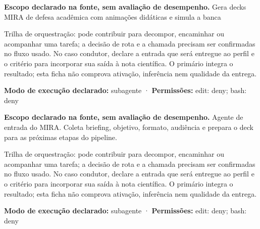 
\begin{descricao}
\textbf{Escopo declarado na fonte, sem avaliação de desempenho.}
Gera decks MIRA de defesa acadêmica com animações didáticas e simula a banca
\end{descricao}

\begin{funcao}
Trilha de orquestração: pode contribuir para decompor, encaminhar ou acompanhar uma tarefa; a decisão de rota e a chamada precisam ser confirmadas no fluxo usado. No caso condutor, declare a entrada que será entregue ao perfil e o critério para incorporar sua saída à nota científica. O primário integra o resultado; esta ficha não comprova ativação, inferência nem qualidade da entrega.
\end{funcao}

\begin{arquitetura}
\textbf{Modo de execução declarado:} subagente · \textbf{Permissões:} edit: deny; bash: deny
\end{arquitetura}


\begin{descricao}
\textbf{Escopo declarado na fonte, sem avaliação de desempenho.}
Agente de entrada do MIRA. Coleta briefing, objetivo, formato, audiência e prepara o deck para as próximas etapas do pipeline.
\end{descricao}

\begin{funcao}
Trilha de orquestração: pode contribuir para decompor, encaminhar ou acompanhar uma tarefa; a decisão de rota e a chamada precisam ser confirmadas no fluxo usado. No caso condutor, declare a entrada que será entregue ao perfil e o critério para incorporar sua saída à nota científica. O primário integra o resultado; esta ficha não comprova ativação, inferência nem qualidade da entrega.
\end{funcao}

\begin{arquitetura}
\textbf{Modo de execução declarado:} subagente · \textbf{Permissões:} edit: deny; bash: deny
\end{arquitetura}

